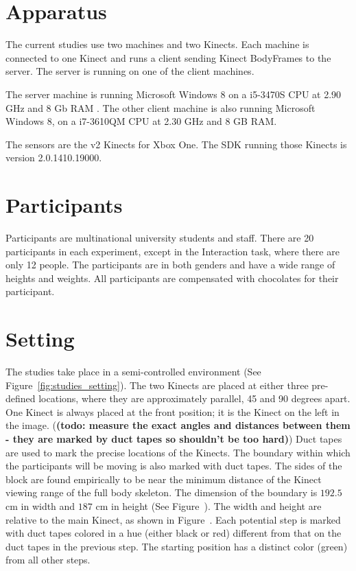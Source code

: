 \section{Apparatus}
\label{sec:studies_apparatus}

The current studies use two machines and two Kinects. Each machine is connected to one Kinect and runs a client sending Kinect BodyFrames to the server. The server is running on one of the client machines.

The server machine is running Microsoft Windows 8 on a i5-3470S CPU at 2.90 GHz and 8 Gb RAM . The other client machine is also running Microsoft Windows 8, on a i7-3610QM CPU at 2.30 GHz and 8 GB RAM.

The sensors are the v2 Kinects for Xbox One. The SDK running those Kinects is version 2.0.1410.19000.

\section{Participants}
\label{sec:studies_participants}

Participants are multinational university students and staff. There are 20 participants in each experiment, except in the Interaction task, where there are only 12 people. The participants are in both genders and have a wide range of heights and weights. All participants are compensated with chocolates for their participant.

\section{Setting}
\label{sec:studies_settings}

The studies take place in a semi-controlled environment (See Figure~\ref{fig:studies_setting}). The two Kinects are placed at either three pre-defined locations, where they are approximately parallel, 45 and 90 degrees apart. One Kinect is always placed at the front position; it is the Kinect on the left in the image. (\textbf{(todo: measure the exact angles and distances between them - they are marked by duct tapes so shouldn't be too hard)}) Duct tapes are used to mark the precise locations of the Kinects. The boundary within which the participants will be moving is also marked with duct tapes. The sides of the block are found empirically to be near the minimum distance of the Kinect viewing range of the full body skeleton. The dimension of the boundary is $192.5$ cm in width and $187$ cm in height (See Figure~). The width and height are relative to the main Kinect, as shown in Figure~. Each potential step is marked with duct tapes colored in a hue (either black or red) different from that on the duct tapes in the previous step. The starting position has a distinct color (green) from all other steps.

